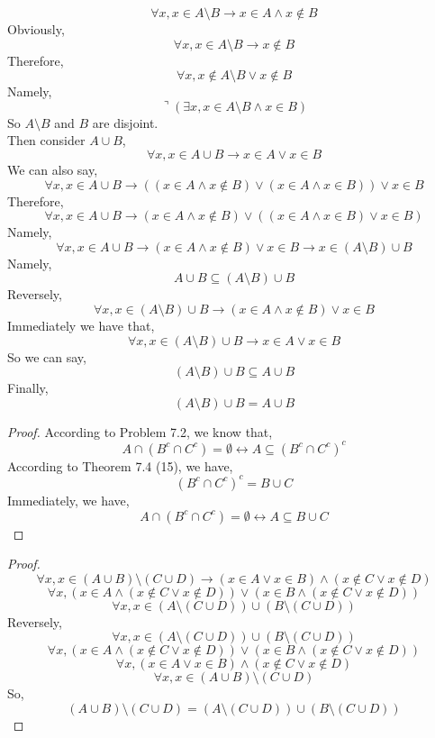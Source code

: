 \documentclass[a4paper, justified]{tufte-handout}
\begin{document}
\begin{problem}[UD Problem 7.14]
\end{problem}

\begin{solution}
  $$\forall x, x \in A \setminus B \rightarrow x \in A \wedge x \notin B$$
  Obviously,
  $$\forall x, x \in A \setminus B \rightarrow x \notin B $$
  Therefore,
  $$\forall x, x \notin A \setminus B \vee x \notin B $$
  Namely,
  $$\urcorner(\exists x, x \in A \setminus B \wedge x \in B) $$
  So $A \setminus B$ and $B$ are disjoint.\\
  Then consider $A \cup B$,
  $$ \forall x, x \in A \cup B \rightarrow x \in A \vee x \in B$$
  We can also say,
  $$ \forall x, x \in A \cup B \rightarrow ((x \in A \wedge x \notin B) \vee (x \in A \wedge x \in B)) \vee x \in B$$
  Therefore,
  $$ \forall x, x \in A \cup B \rightarrow (x \in A \wedge x \notin B) \vee ((x \in A \wedge x \in B) \vee x \in B)$$
  Namely,
  $$ \forall x, x \in A \cup B \rightarrow (x \in A \wedge x \notin B) \vee x \in B \rightarrow x \in (A \setminus B) \cup B $$
  Namely,
  $$ A \cup B \subseteq (A \setminus B) \cup B $$
  Reversely,
  $$\forall x, x \in (A \setminus B) \cup B \rightarrow (x \in A \wedge x \notin B) \vee x \in B $$
  Immediately we have that,
  $$\forall x, x \in (A \setminus B) \cup B \rightarrow x \in A \vee x \in B $$
  So we can say,
  $$ (A \setminus B) \cup B \subseteq A \cup B $$
  Finally,
  $$ (A \setminus B) \cup B = A \cup B $$
\end{solution}

\begin{problem}[UD Problem 7.19]
\end{problem}

\begin{proof}
  According to Problem 7.2, we know that,
  $$ A \cap (B^c \cap C^c) = \emptyset \leftrightarrow A \subseteq (B^c \cap C^c)^c$$
  According to Theorem 7.4 (15), we have,
  $$ (B^c \cap C^c)^c = B \cup C $$
  Immediately, we have,
  $$ A \cap (B^c \cap C^c) = \emptyset \leftrightarrow A \subseteq B \cup C$$
\end{proof}

\begin{problem}[UD Problem 7.20]
\end{problem}

\begin{proof}
  $$ \forall x, x \in (A\cup B) \setminus (C\cup D) \rightarrow (x \in A \vee x \in B) \wedge (x \notin C \vee x \notin D)$$
  $$ \forall x, (x \in A \wedge (x \notin C \vee x \notin D)) \vee (x \in B \wedge (x \notin C \vee x \notin D)) $$
  $$ \forall x, x \in (A \setminus (C \cup D)) \cup (B\setminus (C \cup D)) $$
  Reversely,
  $$ \forall x, x \in (A \setminus (C \cup D)) \cup (B\setminus (C \cup D))$$
  $$\forall x, (x \in A \wedge (x \notin C \vee x \notin D)) \vee (x \in B \wedge (x \notin C \vee x \notin D))$$
  $$ \forall x, (x \in A \vee x \in B) \wedge (x \notin C \vee x \notin D)$$
  $$ \forall x,  x \in (A\cup B) \setminus (C\cup D)  $$
  So,
  $$ (A\cup B) \setminus (C\cup D) =  (A \setminus (C \cup D)) \cup (B\setminus (C \cup D))$$
\end{proof}
\end{document}
